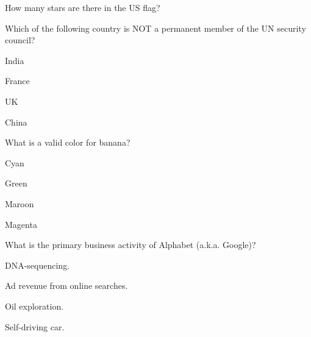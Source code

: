 \documentclass[12pt]{exam}
\begin{document}
\begin{questions}
\begin{oneparchoices}
        \end{oneparchoices}

    \question How many stars are there in the US flag?
    
        \begin{oneparchoices}
        
        
        
        
        
        \end{oneparchoices}

    \question Which of the following country is NOT a permanent member of the 
        UN security council?
    
        \begin{oneparchoices}
        
            \choice India
        
            \choice France
        
            \choice UK
        
            \choice China
        
        \end{oneparchoices}

    \question What is a valid color for banana?
    
        \begin{oneparchoices}
        
            \choice Cyan
        
            \choice Green
        
            \choice Maroon
        
            \choice Magenta
        
        \end{oneparchoices}

    \question What is the primary business activity of Alphabet (a.k.a. Google)?
    
        \begin{oneparchoices}
        
            \choice DNA-sequencing.
        
            \choice Ad revenue from online searches.
        
            \choice Oil exploration.
        
            \choice Self-driving car.
        
        \end{oneparchoices}

\end{questions}
\pagebreak
\end{document}
